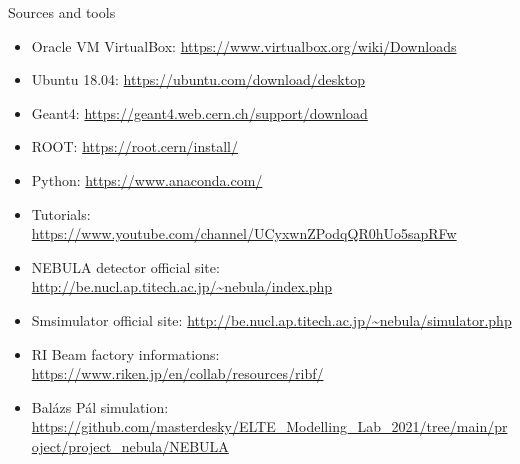 \documentclass[11pt]{beamer}
\begin{document}
\begin{frame}{Sources and tools}
    \begin{itemize}
        \item<tri@1-> Oracle VM VirtualBox: \url{https://www.virtualbox.org/wiki/Downloads}
        \item<tri@1-> Ubuntu 18.04: \url{https://ubuntu.com/download/desktop}
        \item<tri@1-> Geant4: \url{https://geant4.web.cern.ch/support/download}
        \item<tri@1-> ROOT: \url{https://root.cern/install/}
        \item<tri@1-> Python: \url{https://www.anaconda.com/}
        \item<tri@1-> Tutorials: \url{https://www.youtube.com/channel/UCyxwnZPodqQR0hUo5sapRFw}
        \item<tri@1-> NEBULA detector official site: \url{http://be.nucl.ap.titech.ac.jp/~nebula/index.php}
        \item<tri@1-> Smsimulator official site: \url{http://be.nucl.ap.titech.ac.jp/~nebula/simulator.php}
        \item<tri@1-> RI Beam factory informations: \url{https://www.riken.jp/en/collab/resources/ribf/}
        \item<tri@1-> Balázs Pál simulation: \url{https://github.com/masterdesky/ELTE_Modelling_Lab_2021/tree/main/project/project_nebula/NEBULA}
    \end{itemize}
\end{frame}
\end{document}
